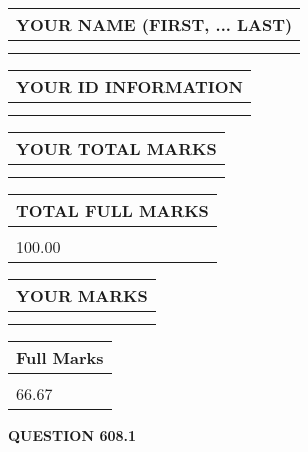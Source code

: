 \documentclass{ctexart}
\begin{document}
   
   
   
\newpage 
\setcounter{page}{ 
   608001 } 
   
   
   
   
\noindent\begin{tabular}{|l|}
\hline
YOUR NAME (FIRST, ... LAST)  \\
\hline
 \\ 
 \\ 
\hline
\end{tabular}
\hspace{0.05in} \begin{tabular}{|l|}
\hline
 YOUR   ID   INFORMATION  \\
\hline
 \\ 
 \\ 
\hline
\end{tabular}
   
   
\vspace{0.2in}\noindent\begin{tabular}{|l|}
\hline
YOUR TOTAL MARKS  \\
\hline
 \\ 
 \\ 
\hline
\end{tabular}
\hspace{0.05in} \begin{tabular}{|l|}
\hline
TOTAL FULL MARKS  \\
\hline
 \\ 
100.00 \\
\hline
\end{tabular}
   
   
 \vspace{0.2in}
 
 
 
 
   
   
  
\vspace{0.2in}
  
\noindent\begin{tabular}{|l|}
\hline
 YOUR MARKS  \\
\hline
 \\ 
 \\ 
\hline
\end{tabular}
\hspace{0.05in} \begin{tabular}{|l|}
\hline
 Full Marks  \\
\hline
 \\ 
66.67 \\
\hline
\end{tabular}
{\textbf{\Large{QUESTION
608.1 
}}}
  
\end{document}
